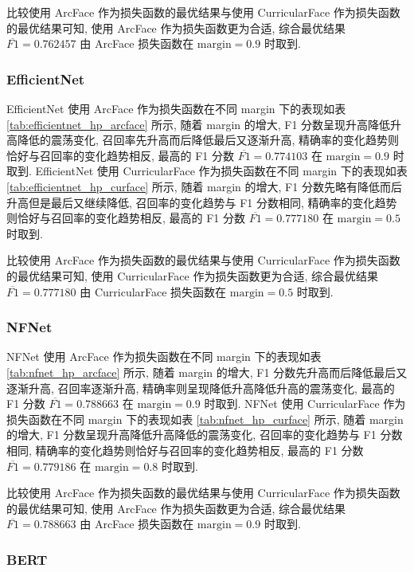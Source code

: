\documentclass[12pt]{article}
\begin{document}
比较使用 ArcFace 作为损失函数的最优结果与使用 CurricularFace 作为损失函数的最优结果可知, 使用 ArcFace 作为损失函数更为合适, 综合最优结果 $\overline{F1}=0.762457$ 由 ArcFace 损失函数在 $\text{margin} = 0.9$ 时取到.

\subsubsection{EfficientNet}

EfficientNet 使用 ArcFace 作为损失函数在不同 margin 下的表现如表 \ref{tab:efficientnet_hp_arcface} 所示, 随着 margin 的增大, F1 分数呈现升高降低升高降低的震荡变化, 召回率先升高而后降低最后又逐渐升高, 精确率的变化趋势则恰好与召回率的变化趋势相反, 最高的 F1 分数 $\overline{F1}=0.774103$ 在 $\text{margin} = 0.9$ 时取到. EfficientNet 使用 CurricularFace 作为损失函数在不同 margin 下的表现如表 \ref{tab:efficientnet_hp_curface} 所示, 随着 margin 的增大, F1 分数先略有降低而后升高但是最后又继续降低, 召回率的变化趋势与 F1 分数相同, 精确率的变化趋势则恰好与召回率的变化趋势相反, 最高的 F1 分数 $\overline{F1}=0.777180$ 在 $\text{margin} = 0.5$ 时取到.

比较使用 ArcFace 作为损失函数的最优结果与使用 CurricularFace 作为损失函数的最优结果可知, 使用 CurricularFace 作为损失函数更为合适, 综合最优结果 $\overline{F1}=0.777180$ 由 CurricularFace 损失函数在 $\text{margin} = 0.5$ 时取到.

\subsubsection{NFNet}

NFNet 使用 ArcFace 作为损失函数在不同 margin 下的表现如表 \ref{tab:nfnet_hp_arcface} 所示, 随着 margin 的增大, F1 分数先升高而后降低最后又逐渐升高, 召回率逐渐升高, 精确率则呈现降低升高降低升高的震荡变化, 最高的 F1 分数 $\overline{F1}=0.788663$ 在 $\text{margin} = 0.9$ 时取到. NFNet 使用 CurricularFace 作为损失函数在不同 margin 下的表现如表 \ref{tab:nfnet_hp_curface} 所示, 随着 margin 的增大, F1 分数呈现升高降低升高降低的震荡变化, 召回率的变化趋势与 F1 分数相同, 精确率的变化趋势则恰好与召回率的变化趋势相反, 最高的 F1 分数 $\overline{F1}=0.779186$ 在 $\text{margin} = 0.8$ 时取到.

比较使用 ArcFace 作为损失函数的最优结果与使用 CurricularFace 作为损失函数的最优结果可知, 使用 ArcFace 作为损失函数更为合适, 综合最优结果 $\overline{F1}=0.788663$ 由 ArcFace 损失函数在 $\text{margin} = 0.9$ 时取到.

\subsubsection{BERT}
\end{document}

